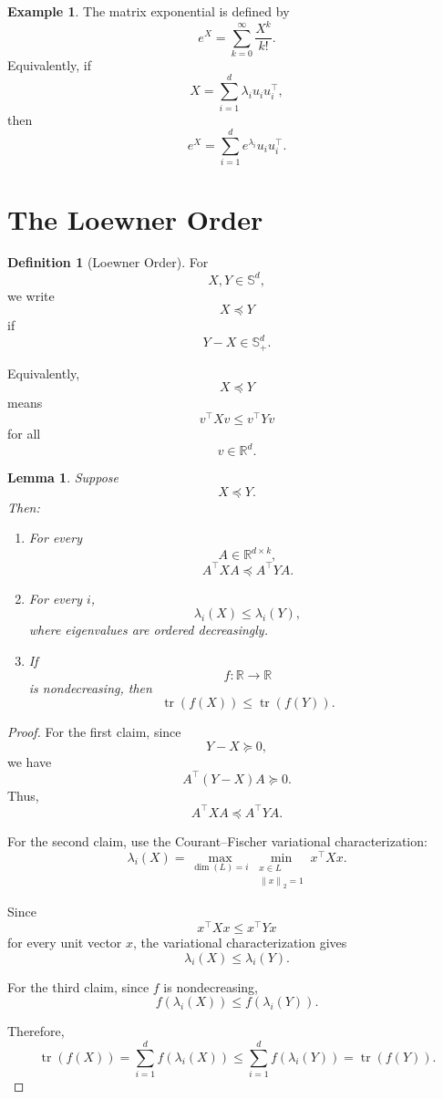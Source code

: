 \documentclass[12pt,oneside]{book}
\numberwithin{equation}{section}
\theoremstyle{definition}
\newtheorem{definition}{Definition}[section]
\newtheorem{example}{Example}[section]
\theoremstyle{plain}
\newtheorem{lemma}{Lemma}[section]
\theoremstyle{remark}
\newcommand{\R}{\mathbb{R}}
\newcommand{\norm}[1]{\left\lVert #1 \right\rVert}
\newcommand{\tr}{\operatorname{tr}}
\begin{document}
\begin{example}
The matrix exponential is defined by
\[
e^X
=
\sum_{k=0}^{\infty}\frac{X^k}{k!}.
\]
Equivalently, if
\[
X=\sum_{i=1}^d \lambda_i u_i u_i^\top,
\]
then
\[
e^X
=
\sum_{i=1}^d e^{\lambda_i}u_i u_i^\top.
\]
\end{example}

\section{The Loewner Order}

\begin{definition}[Loewner Order]
For
\[
X,Y\in\mathbb{S}^d,
\]
we write
\[
X\preceq Y
\]
if
\[
Y-X\in\mathbb{S}_+^d.
\]

Equivalently,
\[
X\preceq Y
\]
means
\[
v^\top Xv\leq v^\top Yv
\]
for all
\[
v\in\R^d.
\]
\end{definition}

\begin{lemma}
Suppose
\[
X\preceq Y.
\]
Then:

\begin{enumerate}
\item For every
\[
A\in\R^{d\times k},
\]
\[
A^\top X A
\preceq
A^\top Y A.
\]

\item For every $i$,
\[
\lambda_i(X)\leq \lambda_i(Y),
\]
where eigenvalues are ordered decreasingly.

\item If
\[
f:\R\to\R
\]
is nondecreasing, then
\[
\tr(f(X))\leq \tr(f(Y)).
\]
\end{enumerate}
\end{lemma}

\begin{proof}
For the first claim, since
\[
Y-X\succeq 0,
\]
we have
\[
A^\top(Y-X)A\succeq0.
\]
Thus,
\[
A^\top XA\preceq A^\top YA.
\]

For the second claim, use the Courant--Fischer variational characterization:
\[
\lambda_i(X)
=
\max_{\dim(L)=i}
\min_{\substack{x\in L\\ \norm{x}_2=1}}
x^\top Xx.
\]

Since
\[
x^\top Xx\leq x^\top Yx
\]
for every unit vector $x$, the variational characterization gives
\[
\lambda_i(X)\leq \lambda_i(Y).
\]

For the third claim, since $f$ is nondecreasing,
\[
f(\lambda_i(X))\leq f(\lambda_i(Y)).
\]

Therefore,
\[
\tr(f(X))
=
\sum_{i=1}^d f(\lambda_i(X))
\leq
\sum_{i=1}^d f(\lambda_i(Y))
=
\tr(f(Y)).
\]
\end{proof}
\end{document}
